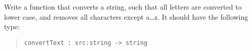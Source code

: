\label{lowercase}
Write a function that converts a string, such that all letters
are converted to lower case, and removes all characters except
a\ldots z. It should have the following type:
\begin{quote}
  \mbox{\lstinline!convertText : src:string -> string!}
\end{quote}
